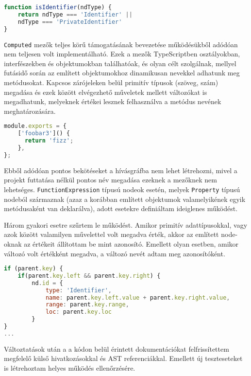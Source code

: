\begin{lstlisting}[caption={Identifier típus szűrő},label={lst:jsonconfig}, language={JavaScript}]
function isIdentifier(ndType) {
    return ndType === 'Identifier' ||
    ndType === 'PrivateIdentifier'
}
\end{lstlisting}

\texttt{Computed} mezők teljes körű támogatásának bevezetése működésükből adódóan nem teljesen volt implementálható.
Ezek a mezők TypeScriptben osztályokban, interfészekben és objektumokban találhatóak, és olyan célt szolgálnak, mellyel futásidő során az említett objektumokhoz dinamikusan nevekkel adhatunk meg metódusokat. Kapcsos zárójeleken belül primitív típusok (szöveg, szám) megadása és ezek között elvégezhető műveletek mellett változókat is megadhatunk, melyeknek értékei lesznek felhasználva a metódus nevének meghatározására.

\begin{lstlisting}[caption={Computed mező példa},label={lst:jsonconfig}, language={JavaScript}]
module.exports = {
    ['foobar3']() {
      return 'fizz';
    },
};
\end{lstlisting}

Ebből adódóan pontos bekötéseket a hívásgráfba nem lehet létrehozni, mivel a projekt futtatása nélkül pontos név megadása ezeknek a mezőknek nem lehetséges.
\texttt{FunctionExpression} típusú nodeok esetén, melyek \texttt{Property} típusú nodeból származnak (azaz a korábban említett objektumok valamelyikének egyik metódusaként van deklarálva), adott esetekre definiáltam ideiglenes működést.

Három gyakori esetre szűrtem le működést. Amikor primitív adattípusokkal, vagy azok között valamilyen művelettel volt megadva érték, akkor az említett node-oknak az értékeit állítottam be mint azonosító. Emellett olyan esetben, amikor változó volt értékként megadva, a változó nevét adtam meg azonosítóként.

\begin{lstlisting}[caption={Azonosító beállítás példa},label={lst:jsonconfig}, language={JavaScript}]
if (parent.key) {
    if(parent.key.left && parent.key.right) {
        nd.id = {
            type: 'Identifier',
            name: parent.key.left.value + parent.key.right.value,
            range: parent.key.range,
            loc: parent.key.loc
        }
}
...
\end{lstlisting}

Változtatások után a a kódon belül érintett dokumentációkat felfrissítettem megfelelő külső hivatkozásokkal és AST referenciákkal. Emellett új teszteseteket is létrehoztam helyes működés ellenőrzésére.